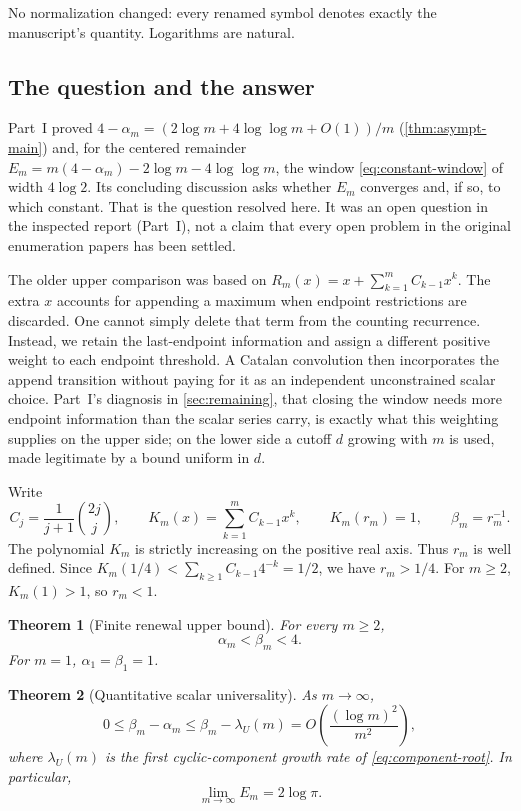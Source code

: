 \documentclass[11pt,a4paper]{article}
\newtheorem{theorem}{Theorem}[section]
\theoremstyle{definition}\newaliascnt{definition}{theorem}
\theoremstyle{remark}\newaliascnt{remark}{theorem}
\begin{document}
No normalization changed: every renamed symbol denotes exactly the
manuscript's quantity. Logarithms are natural.

\subsection{The question and the answer}
\label{crem:sec:answer}
Part~I proved $4-\alpha_m=(2\log m+4\log\log m+O(1))/m$
(\cref{thm:asympt-main}) and, for the centered remainder
$E_m=m(4-\alpha_m)-2\log m-4\log\log m$, the window
\eqref{eq:constant-window} of width $4\log2$. Its concluding discussion asks
whether $E_m$ converges and, if so, to which constant. That is the question
resolved here. It was an open question in the inspected report (Part~I), not
a claim that every open problem in the original enumeration papers has been
settled.

The older upper comparison was based on $R_m(x)=x+\sum_{k=1}^mC_{k-1}x^k$.
The extra $x$ accounts for appending a maximum when endpoint restrictions are
discarded. One cannot simply delete that term from the counting recurrence.
Instead, we retain the last-endpoint information and assign a different
positive weight to each endpoint threshold. A Catalan convolution then
incorporates the append transition without paying for it as an independent
unconstrained scalar choice. Part~I's diagnosis in \cref{sec:remaining}, that
closing the window needs more endpoint information than the scalar series
carry, is exactly what this weighting supplies on the upper side; on the
lower side a cutoff $d$ growing with $m$ is used, made legitimate by a bound
uniform in $d$.

Write
\begin{equation}
 C_j=\frac1{j+1}\binom{2j}{j},\qquad
 K_m(x)=\sum_{k=1}^m C_{k-1}x^k,
 \qquad K_m(r_m)=1,
 \qquad \beta_m=r_m^{-1}.
 \label{crem:eq:scalar-root}
\end{equation}
The polynomial $K_m$ is strictly increasing on the positive real axis. Thus
$r_m$ is well defined. Since $K_m(1/4)<\sum_{k\ge1}C_{k-1}4^{-k}=1/2$, we have
$r_m>1/4$. For $m\ge2$, $K_m(1)>1$, so $r_m<1$.

\begin{theorem}[Finite renewal upper bound]\label{crem:thm:main-upper}
For every $m\ge2$,
\[
 \alpha_m<\beta_m<4.
\]
For $m=1$, $\alpha_1=\beta_1=1$.
\end{theorem}

\begin{theorem}[Quantitative scalar universality]\label{crem:thm:main-quantitative}
As $m\to\infty$,
\begin{equation}
 0\le\beta_m-\alpha_m
 \le\beta_m-\lambda_U(m)
 =O\!\left(\frac{(\log m)^2}{m^2}\right),
 \label{crem:eq:main-quantitative}
\end{equation}
where $\lambda_U(m)$ is the first cyclic-component growth rate of
\eqref{eq:component-root}. In particular,
\begin{equation}
 \boxed{\displaystyle\lim_{m\to\infty}E_m=2\log\pi.}
 \label{crem:eq:main-constant}
\end{equation}
\end{theorem}
\end{document}
